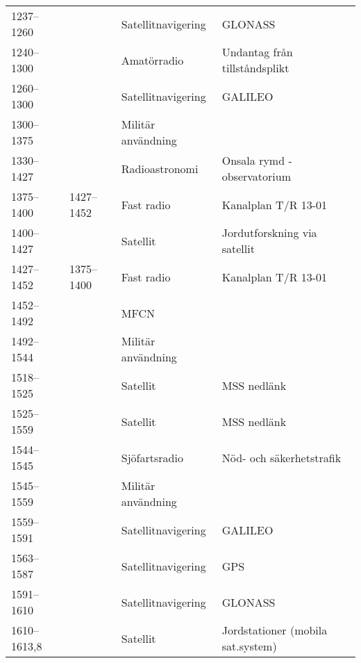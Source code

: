 \begin{landscape}
\begin{landscape}
\begin{longtable}{llll}
	1237--1260         &                    & Satellitnavigering      & GLONASS                               \\
	1240--1300         &                    & Amatörradio             & Undantag från tillståndsplikt         \\
	1260--1300         &                    & Satellitnavigering      & GALILEO                               \\
	1300--1375         &                    & Militär användning      &                                       \\
	1330--1427         &                    & Radioastronomi          & Onsala rymd - observatorium           \\
	1375--1400         & 1427--1452         & Fast radio              & Kanalplan T/R 13-01                   \\
	1400--1427         &                    & Satellit                & Jordutforskning via satellit          \\
	1427--1452         & 1375--1400         & Fast radio              & Kanalplan T/R 13-01                   \\
	1452--1492         &                    & MFCN                    &                                       \\
	1492--1544         &                    & Militär användning      &                                       \\
	1518--1525         &                    & Satellit                & MSS nedlänk                           \\
	1525--1559         &                    & Satellit                & MSS nedlänk                           \\
	1544--1545         &                    & Sjöfartsradio           & Nöd- och säkerhetstrafik              \\
	1545--1559         &                    & Militär användning      &                                       \\
	1559--1591         &                    & Satellitnavigering      & GALILEO                               \\
	1563--1587         &                    & Satellitnavigering      & GPS                                   \\
	1591--1610         &                    & Satellitnavigering      & GLONASS                               \\
	1610--1613,8       &                    & Satellit                & Jordstationer (mobila sat.system)     \\

\end{longtable}
\end{landscape}
\end{landscape}

